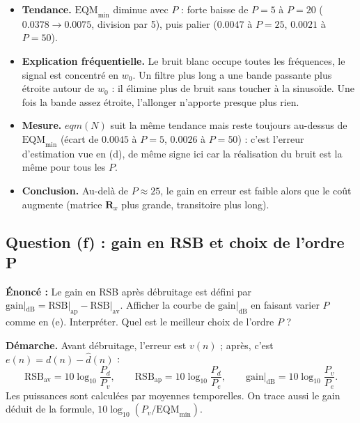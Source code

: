 \begin{interpretation}
\begin{itemize}
  \item \textbf{Tendance.} $\mathrm{EQM}_{\min}$ diminue avec $P$ : forte baisse de $P=5$ à $P=20$ ($0.0378\to 0.0075$, division par 5), puis palier ($0.0047$ à $P=25$, $0.0021$ à $P=50$).
  \item \textbf{Explication fréquentielle.} Le bruit blanc occupe toutes les fréquences, le signal est concentré en $w_0$. Un filtre plus long a une bande passante plus étroite autour de $w_0$ : il élimine plus de bruit sans toucher à la sinusoïde. Une fois la bande assez étroite, l'allonger n'apporte presque plus rien.
  \item \textbf{Mesure.} $eqm(N)$ suit la même tendance mais reste toujours au-dessus de $\mathrm{EQM}_{\min}$ (écart de $0.0045$ à $P=5$, $0.0026$ à $P=50$) : c'est l'erreur d'estimation vue en (d), de même signe ici car la réalisation du bruit est la même pour tous les $P$.
  \item \textbf{Conclusion.} Au-delà de $P\approx 25$, le gain en erreur est faible alors que le coût augmente (matrice $\mathbf{R}_x$ plus grande, transitoire plus long).
\end{itemize}
\end{interpretation}

\subsection{Question (f) : gain en RSB et choix de l'ordre P}

\begin{enonce}
\textbf{Énoncé :} Le gain en RSB après débruitage est défini par $\mathrm{gain}|_{\mathrm{dB}}=\mathrm{RSB}|_{\mathrm{ap}}-\mathrm{RSB}|_{\mathrm{av}}$. Afficher la courbe de $\mathrm{gain}|_{\mathrm{dB}}$ en faisant varier $P$ comme en (e). Interpréter. Quel est le meilleur choix de l'ordre $P$ ?
\end{enonce}

\textbf{Démarche.} Avant débruitage, l'erreur est $v(n)$ ; après, c'est $e(n)=d(n)-\hat d(n)$ :
\[
\mathrm{RSB}_{\mathrm{av}}=10\log_{10}\frac{P_d}{P_v},\qquad
\mathrm{RSB}_{\mathrm{ap}}=10\log_{10}\frac{P_d}{P_e},\qquad
\mathrm{gain}|_{\mathrm{dB}}=10\log_{10}\frac{P_v}{P_e}.
\]
Les puissances sont calculées par moyennes temporelles. On trace aussi le gain déduit de la formule, $10\log_{10}(P_v/\mathrm{EQM}_{\min})$.

